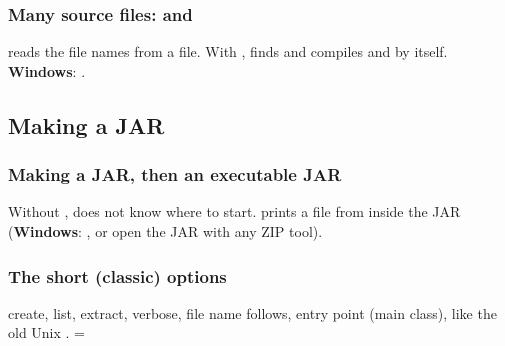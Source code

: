 \documentclass[aspectratio=169,10pt,compress]{beamer}
\newcommand{\win}{\textbf{Windows}}
\begin{document}
\begin{frame}[t,fragile] \frametitle{Many source files:  and }

  \vspace{0.1em}
  \small
   reads the file names from a file. With ,  finds and compiles
   and  by itself. \win: .
\end{frame}


\subsection[Jar]{Making a JAR}




\begin{frame}[t,fragile] \frametitle{Making a JAR, then an executable JAR}

  \vspace{0.1em}
  \small
  Without ,  does not know where to start.  prints a file from inside the JAR
  (\win: , or open the JAR with any ZIP tool).
\end{frame}




\begin{frame}[t,fragile] \frametitle{The short (classic)  options}

  \vspace{0.1em}
  \small
   create,  list,  extract,  verbose,  file name follows,  entry point (main class),
  like the old Unix .  = 
\end{frame}
\end{document}
